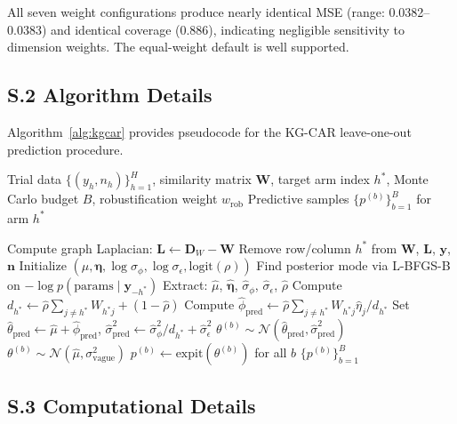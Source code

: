 \documentclass[12pt]{article}
\newcommand{\bW}{\mathbf{W}}
\newcommand{\bL}{\mathbf{L}}
\newcommand{\bD}{\mathbf{D}}
\begin{document}
All seven weight configurations produce nearly identical MSE (range: 0.0382--0.0383) and identical coverage (0.886), indicating negligible sensitivity to dimension weights. The equal-weight default is well supported.

\subsection*{S.2 Algorithm Details}

Algorithm~\ref{alg:kgcar} provides pseudocode for the KG-CAR leave-one-out prediction procedure.

\begin{algorithm}[ht]
\caption{KG-CAR Leave-One-Out Prediction}
\label{alg:kgcar}
\begin{algorithmic}[1]
\REQUIRE Trial data $\{(y_h, n_h)\}_{h=1}^H$, similarity matrix $\bW$, target arm index $h^*$, Monte Carlo budget $B$, robustification weight $w_{\text{rob}}$
\ENSURE Predictive samples $\{p^{(b)}\}_{b=1}^B$ for arm $h^*$

\STATE Compute graph Laplacian: $\bL \gets \bD_W - \bW$
\STATE Remove row/column $h^*$ from $\bW$, $\bL$, $\mathbf{y}$, $\mathbf{n}$
\STATE Initialize $(\mu, \boldsymbol{\eta}, \log\sigma_\phi, \log\sigma_\epsilon, \text{logit}(\rho))$
\STATE Find posterior mode via L-BFGS-B on $-\log p(\text{params} \mid \mathbf{y}_{-h^*})$
\STATE Extract: $\hat{\mu}$, $\hat{\boldsymbol{\eta}}$, $\hat{\sigma}_\phi$, $\hat{\sigma}_\epsilon$, $\hat{\rho}$
\STATE Compute $d_{h^*} \gets \hat{\rho} \sum_{j \neq h^*} W_{h^* j} + (1 - \hat{\rho})$
\STATE Compute $\hat{\phi}_{\text{pred}} \gets \hat{\rho} \sum_{j \neq h^*} W_{h^* j} \hat{\eta}_j / d_{h^*}$
\STATE Set $\hat{\theta}_{\text{pred}} \gets \hat{\mu} + \hat{\phi}_{\text{pred}}$, $\hat{\sigma}_{\text{pred}}^2 \gets \hat{\sigma}_\phi^2 / d_{h^*} + \hat{\sigma}_\epsilon^2$
  \STATE $\theta^{(b)} \sim \mathcal{N}(\hat{\theta}_{\text{pred}}, \hat{\sigma}_{\text{pred}}^2)$ \hfill {}
\ENDFOR
{}
  \STATE $\theta^{(b)} \sim \mathcal{N}(\hat{\mu}, \sigma_{\text{vague}}^2)$ \hfill {}
\ENDFOR
\STATE $p^{(b)} \gets \text{expit}(\theta^{(b)})$ for all $b$
\RETURN $\{p^{(b)}\}_{b=1}^B$
\end{algorithmic}
\end{algorithm}

\subsection*{S.3 Computational Details}
\end{document}
